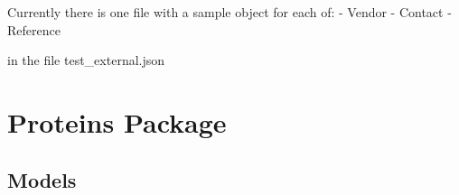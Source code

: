 \documentclass[letterpaper,10pt,english]{sphinxmanual}
\begin{document}
Currently there is one file with a sample object for each of:
- Vendor
- Contact
- Reference


in the file test\_external.json



\section{Proteins Package}
\label{api:module-experimentdb.proteins}\label{api:proteins-package}

\subsection{Models}
\label{api:id16}\label{api:module-experimentdb.proteins.models}
\end{document}
